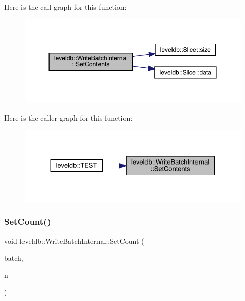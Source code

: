 Here is the call graph for this function\+:
\nopagebreak
\begin{figure}[H]
\begin{center}
\leavevmode
\includegraphics[width=350pt]{classleveldb_1_1_write_batch_internal_aa07e75250aed00d06f2e4df85ee926b9_cgraph}
\end{center}
\end{figure}
Here is the caller graph for this function\+:
\nopagebreak
\begin{figure}[H]
\begin{center}
\leavevmode
\includegraphics[width=330pt]{classleveldb_1_1_write_batch_internal_aa07e75250aed00d06f2e4df85ee926b9_icgraph}
\end{center}
\end{figure}
\mbox{\label{classleveldb_1_1_write_batch_internal_ae03d20619da53aae175dd28d61c90bd9}} 
\subsubsection{\texorpdfstring{SetCount()}{SetCount()}}
{\footnotesize\ttfamily void leveldb\+::\+Write\+Batch\+Internal\+::\+Set\+Count (\begin{DoxyParamCaption}\item[{\mbox{\hyperlink{classleveldb_1_1_write_batch}{Write\+Batch}} $\ast$}]{batch,  }\item[{int}]{n }\end{DoxyParamCaption})\hspace{0.3cm}{\ttfamily [static]}}

